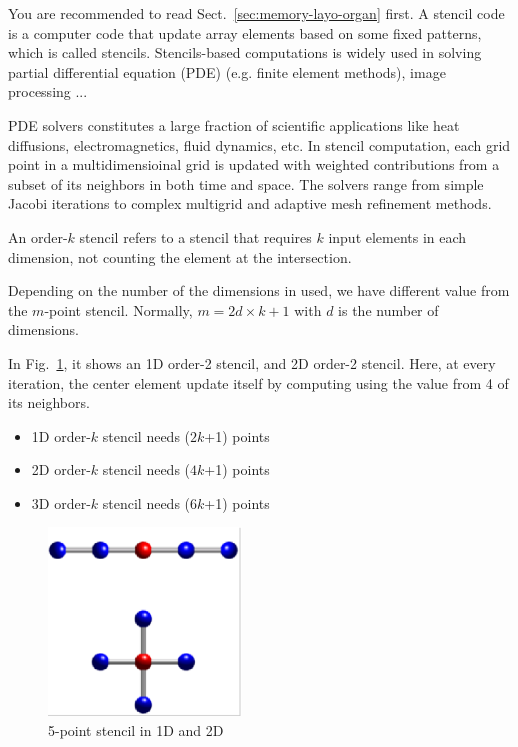 You are recommended to read Sect.~\ref{sec:memory-layo-organ} first.
A stencil code is a computer code that update array elements based on
some fixed patterns, which is called stencils. Stencils-based
computations is widely used in solving partial differential equation
(PDE) (e.g. finite element methods), image processing ...

PDE solvers constitutes a large fraction of scientific applications
like heat diffusions, electromagnetics, fluid dynamics, etc. In
stencil computation, each grid point in a multidimensioinal grid is
updated with weighted contributions from a subset of its neighbors in
both time and space. The solvers range from simple Jacobi iterations
to complex multigrid and adaptive mesh refinement methods. 

\begin{framed}
  An order-$k$ stencil refers to a stencil that requires $k$ input
  elements in each dimension, not counting the element at the
  intersection.

  Depending on the number of the dimensions in used, we have different
  value from the $m$-point stencil. Normally, $m=2d\times k + 1$ with
  $d$ is the number of dimensions. 
\end{framed}

In Fig.~\ref{fig:5-point_stencil}, it shows an 1D order-2 stencil, and
2D order-2 stencil. Here, at every iteration, the center element
update itself by computing using the value from 4 of its neighbors. 

\begin{itemize}
\item 1D order-$k$ stencil needs ($2k$+1) points
\item 2D order-$k$ stencil needs ($4k$+1) points
\item 3D order-$k$ stencil needs ($6k$+1) points
\end{itemize}
\begin{figure}[hbt]
  \centerline{\includegraphics[height=5cm,
    angle=0]{./images/5-point_stencil.eps}}
  \caption{5-point stencil in 1D and 2D}
  \label{fig:5-point_stencil}
\end{figure}

